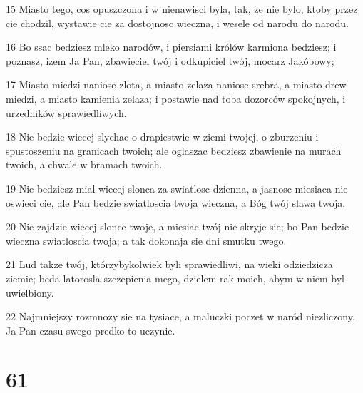 \par 15 Miasto tego, cos opuszczona i w nienawisci byla, tak, ze nie bylo, ktoby przez cie chodzil, wystawie cie za dostojnosc wieczna, i wesele od narodu do narodu.
\par 16 Bo ssac bedziesz mleko narodów, i piersiami królów karmiona bedziesz; i poznasz, izem Ja Pan, zbawieciel twój i odkupiciel twój, mocarz Jakóbowy;
\par 17 Miasto miedzi naniose zlota, a miasto zelaza naniose srebra, a miasto drew miedzi, a miasto kamienia zelaza; i postawie nad toba dozorców spokojnych, i urzedników sprawiedliwych.
\par 18 Nie bedzie wiecej slychac o drapiestwie w ziemi twojej, o zburzeniu i spustoszeniu na granicach twoich; ale oglaszac bedziesz zbawienie na murach twoich, a chwale w bramach twoich.
\par 19 Nie bedziesz mial wiecej slonca za swiatlosc dzienna, a jasnosc miesiaca nie oswieci cie, ale Pan bedzie swiatloscia twoja wieczna, a Bóg twój slawa twoja.
\par 20 Nie zajdzie wiecej slonce twoje, a miesiac twój nie skryje sie; bo Pan bedzie wieczna swiatloscia twoja; a tak dokonaja sie dni smutku twego.
\par 21 Lud takze twój, którzybykolwiek byli sprawiedliwi, na wieki odziedzicza ziemie; beda latorosla szczepienia mego, dzielem rak moich, abym w niem byl uwielbiony.
\par 22 Najmniejszy rozmnozy sie na tysiace, a maluczki poczet w naród niezliczony. Ja Pan czasu swego predko to uczynie.

\chapter{61}

